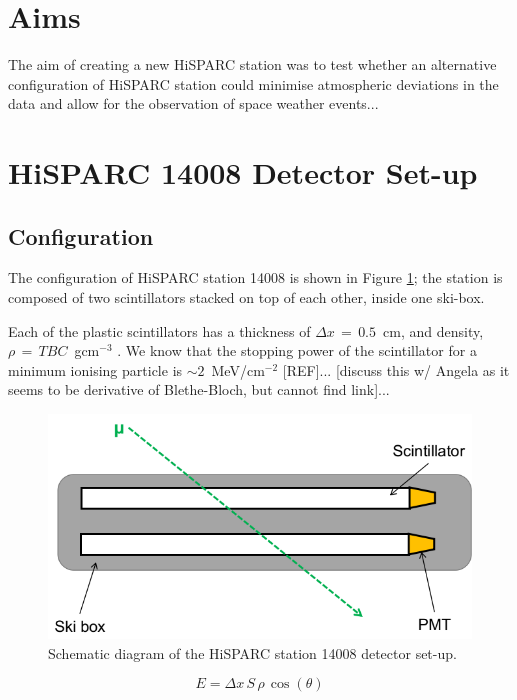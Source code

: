 \section{Aims}\label{sec:HS_14008_aims}

The aim of creating a new HiSPARC station was to test whether an alternative configuration of HiSPARC station could minimise atmospheric deviations in the data and allow for the observation of space weather events...



\section{HiSPARC 14008 Detector Set-up}\label{sec:HiSPARC_14008}


\subsection{Configuration}

The configuration of HiSPARC station 14008 is shown in Figure \ref{fig:14008_config}; the station is composed of two scintillators stacked on top of each other, inside one ski-box. 

Each of the plastic scintillators has a thickness of $\Delta x \, = \, 0.5$~cm, and density, $\rho \, = \, TBC$~gcm$^{-3}$ . We know that the stopping power of the scintillator for a minimum ionising particle is $\sim 2$~MeV/cm$^{-2}$ [REF]... [discuss this w/ Angela as it seems to be derivative of Blethe-Bloch, but cannot find link]...

\begin{figure}
	\center
	\includegraphics[width=0.5\columnwidth]{14008_config.png}
	\caption{Schematic diagram of the HiSPARC station 14008 detector set-up.}
	\label{fig:14008_config}
\end{figure}

\begin{equation}
E = \Delta x \, S \, \rho \, \cos(\theta)
\label{eq:energy_loss}
\end{equation}

